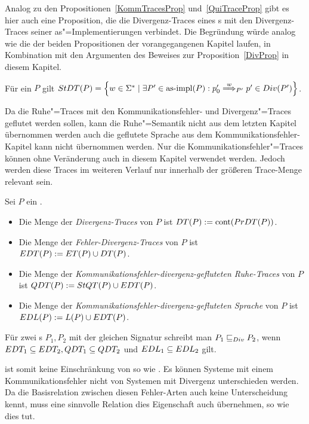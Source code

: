 Analog zu den Propositionen~\ref{KommTracesProp} und~\ref{QuiTraceProp} gibt es
hier auch eine Proposition, die die Divergenz-Traces eines \MEIO{}s mit den
Divergenz-Traces seiner as"=Implementierungen verbindet. Die Begründung würde
analog wie die der beiden Propositionen der vorangegangenen Kapitel laufen, in
Kombination mit den Argumenten des Beweises zur Proposition~\ref{DivProp} in
diesem Kapitel.

\begin{Prop}
  Für ein \MEIO{} $P$ gilt $\StDT (P) = \left\{w\in\Sigma ^*\mid \exists P' \in
  \asimp (P): p'_0\weakmust[w]_{P'} p'\in Div(P')\right\}$.
\end{Prop}

Da die Ruhe"=Traces mit den Kommunikationsfehler- und Divergenz"=Traces
geflutet werden sollen, kann die Ruhe"=Semantik nicht aus dem letzten Kapitel
übernommen werden auch die geflutete Sprache aus dem
Kommunikationsfehler-Kapitel kann nicht übernommen werden. Nur die
Kommunikationsfehler"=Traces \ET{} können ohne Veränderung auch in diesem
Kapitel verwendet werden. Jedoch werden diese Traces im weiteren Verlauf nur
innerhalb der größeren Trace-Menge \EDT{} relevant sein.

\begin{Def}
  \label{DivSemDef}
  Sei $P$ ein \MEIO{}.
  \begin{itemize}
    \item Die Menge der \emph{Divergenz-Traces} von $P$ ist $DT (P) := \mathrm{cont}
      (PrDT (P))$.
    \item Die Menge der \emph{Fehler-Divergenz-Traces} von $P$ ist $EDT (P) :=
      ET (P)\cup DT (P)$.
    \item Die Menge der \emph{Kommunikationsfehler-divergenz-gefluteten
      Ruhe-Traces} von $P$ ist $QDT (P) := StQT (P)\cup EDT (P)$.
    \item Die Menge der \emph{Kommunikationsfehler-divergenz-gefluteten
      Sprache} von $P$ ist $EDL (P) := L(P)\cup EDT (P)$.
  \end{itemize}
  Für zwei \MEIO{}s $P_1,P_2$ mit der gleichen Signatur schreibt man $P_1 \sqsubseteq  _{Div}
  P_2$, wenn $EDT _1\subseteq EDT _2, QDT _1\subseteq QDT _2$ und $EDL
  _1\subseteq EDL _2$ gilt.
\end{Def}

\DRel{} ist somit keine Einschränkung von \ERel{} so wie \QRel{}. Es können
Systeme mit einem Kommunikationsfehler nicht von Systemen mit Divergenz
unterschieden werden. Da die Basisrelation zwischen diesen Fehler-Arten auch
keine Unterscheidung kennt, muss eine sinnvolle Relation dies Eigenschaft auch
übernehmen, so wie \DRel{} dies tut.

